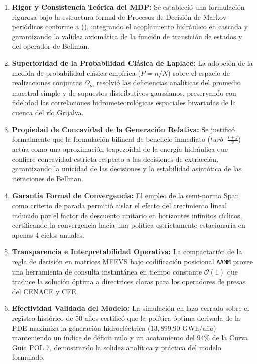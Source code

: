\documentclass[
  spanish,
  letterpaper,
]{scrreprt}
\providecommand{\tightlist}{%
  \setlength{\itemsep}{0pt}\setlength{\parskip}{0pt}}
\theoremstyle{definition}
\theoremstyle{remark}
\begin{document}
\begin{enumerate}
\def\labelenumi{\arabic{enumi}.}
\tightlist
\item
  \textbf{Rigor y Consistencia Teórica del MDP:} Se estableció una
  formulación rigurosa bajo la estructura formal de Procesos de Decisión
  de Markov periódicos conforme a
  (), integrando el
  acoplamiento hidráulico en cascada y garantizando la validez
  axiomática de la función de transición de estados y del operador de
  Bellman.
\item
  \textbf{Superioridad de la Probabilidad Clásica de Laplace:} La
  adopción de la medida de probabilidad clásica empírica (\(P = n/N\))
  sobre el espacio de realizaciones conjuntas \(\Omega_m\) resolvió las
  deficiencias analíticas del promedio muestral simple y de supuestos
  distributivos gaussianos, preservando con fidelidad las correlaciones
  hidrometeorológicas espaciales bivariadas de la cuenca del río
  Grijalva.
\item
  \textbf{Propiedad de Concavidad de la Generación Relativa:} Se
  justificó formalmente que la formulación bilineal de beneficio
  inmediato (\(turb \cdot \frac{i+j}{2}\)) actúa como una aproximación
  trapezoidal de la energía hidráulica que confiere concavidad estricta
  respecto a las decisiones de extracción, garantizando la unicidad de
  las decisiones y la estabilidad asintótica de las iteraciones de
  Bellman.
\item
  \textbf{Garantía Formal de Convergencia:} El empleo de la semi-norma
  Span como criterio de parada permitió aislar el efecto del crecimiento
  lineal inducido por el factor de descuento unitario en horizontes
  infinitos cíclicos, certificando la convergencia hacia una política
  estrictamente estacionaria en apenas 4 ciclos anuales.
\item
  \textbf{Transparencia e Interpretabilidad Operativa:} La compactación
  de la regla de decisión en matrices MEEVS bajo codificación posicional
  \texttt{AAMM} provee una herramienta de consulta instantánea en tiempo
  constante \(\mathcal{O}(1)\) que traduce la solución óptima a
  directrices claras para los operadores de presas del CENACE y CFE.
\item
  \textbf{Efectividad Validada del Modelo:} La simulación en lazo
  cerrado sobre el registro histórico de 50 años certificó que la
  política óptima derivada de la PDE maximiza la generación
  hidroeléctrica (\(13,899.90\text{ GWh/año}\)) manteniendo un índice de
  déficit nulo y un acatamiento del \(94\%\) de la Curva Guía POL 7,
  demostrando la solidez analítica y práctica del modelo formulado.
\end{enumerate}
\end{document}
